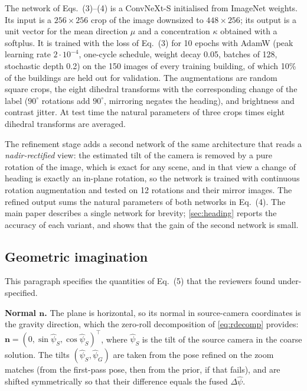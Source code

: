 The network of Eqs.~(3)--(4) is a ConvNeXt-S initialised from ImageNet weights. Its input is a $256{\times}256$ crop of the image downsized to $448{\times}256$; its output is a unit vector for the mean direction $\mu$ and a concentration $\kappa$ obtained with a softplus. It is trained with the loss of Eq.~(3) for 10 epochs with AdamW (peak learning rate $2{\cdot}10^{-4}$, one-cycle schedule, weight decay 0.05, batches of 128, stochastic depth 0.2) on the 150 images of every training building, of which 10\% of the buildings are held out for validation. The augmentations are random square crops, the eight dihedral transforms with the corresponding change of the label ($90^\circ$ rotations add $90^\circ$, mirroring negates the heading), and brightness and contrast jitter. At test time the natural parameters of three crops times eight dihedral transforms are averaged.

The refinement stage adds a second network of the same architecture that reads a \emph{nadir-rectified} view: the estimated tilt of the camera is removed by a pure rotation of the image, which is exact for any scene, and in that view a change of heading is exactly an in-plane rotation, so the network is trained with continuous rotation augmentation and tested on 12 rotations and their mirror images. The refined output sums the natural parameters of both networks in Eq.~(4). The main paper describes a single network for brevity; \cref{sec:heading} reports the accuracy of each variant, and shows that the gain of the second network is small.

\subsection{Geometric imagination}
\label{sec:imag}

This paragraph specifies the quantities of Eq.~(5) that the reviewers found under-specified.

\noindent\textbf{Normal $\mathbf{n}$.} The plane is horizontal, so its normal in source-camera coordinates is the gravity direction, which the zero-roll decomposition of \cref{eq:rdecomp} provides: $\mathbf{n}=(0,\sin\hat\psi_S,\cos\hat\psi_S)^{\!\top}$, where $\hat\psi_S$ is the tilt of the source camera in the coarse solution. The tilts $(\hat\psi_S,\hat\psi_G)$ are taken from the pose refined on the zoom matches (from the first-pass pose, then from the prior, if that fails), and are shifted symmetrically so that their difference equals the fused $\Delta\hat\psi$.

